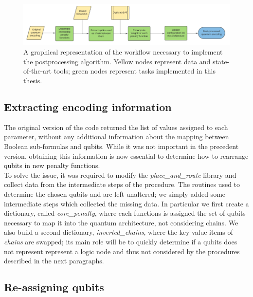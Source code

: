 \begin{figure}[t]
	\begin{center}
	\includegraphics[width=\textwidth]{images/Workflow.png}
	\caption{A graphical representation of the workflow necessary to implement the postprocessing algorithm. Yellow nodes represent data and state-of-the-art tools; green nodes represent tasks implemented in this thesis.}
	\end{center}
\end{figure}

\subsection{Extracting encoding information}

The original version of the code returned the list of values assigned to each parameter, without any additional information about the mapping between Boolean sub-formulas and qubits. While it was not important in the precedent version, obtaining this information is now essential to determine how to rearrange qubits in new penalty functions. \\
To solve the issue, it was required to modify the \textit{place\_and\_route} library and collect data from the intermediate steps of the procedure. The routines used to determine the chosen qubits and are left unaltered; we simply added some intermediate steps which collected the missing data. In particular we first create a dictionary, called \textit{core\_penalty}, where each functions is assigned the set of qubits necessary to map it into the quantum architecture, not considering chains. We also build a second dictionary, \textit{inverted\_chains}, where the key-value items of \textit{chains} are swapped; its main role will be to quickly determine if a qubits does not represent represent a logic node and thus not considered by the procedures described in the next paragraphs.

\subsection{Re-assigning qubits}

